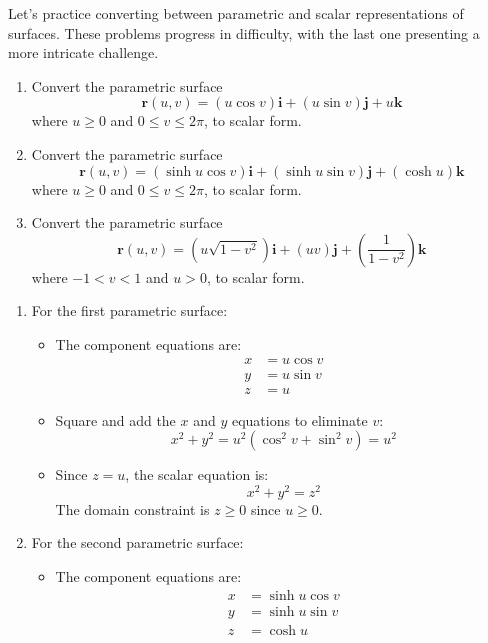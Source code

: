 \exampleline
\begin{example}
Let’s practice converting between parametric and scalar representations of surfaces. These problems progress in difficulty, with the last one presenting a more intricate challenge.

\begin{enumerate}
\item Convert the parametric surface
\[
\mathbf{r}(u,v) = (u\cos v)\mathbf{i} + (u\sin v)\mathbf{j} + u\mathbf{k}
\]
where $u \geq 0$ and $0 \leq v \leq 2\pi$, to scalar form.

\item Convert the parametric surface
\[
\mathbf{r}(u,v) = (\sinh u \cos v)\mathbf{i} + (\sinh u \sin v)\mathbf{j} + (\cosh u)\mathbf{k}
\]
where $u \geq 0$ and $0 \leq v \leq 2\pi$, to scalar form.

\item Convert the parametric surface
\[
\mathbf{r}(u,v) = \left(u\sqrt{1-v^2}\right)\mathbf{i} + \left(uv\right)\mathbf{j} + \left(\frac{1}{1-v^2}\right)\mathbf{k}
\]
where $-1 < v < 1$ and $u > 0$, to scalar form.
\end{enumerate}

\begin{solution}
\begin{enumerate}
\item For the first parametric surface:
   \begin{itemize}
       \item The component equations are:
       \begin{align*}
           x &= u \cos v \\
           y &= u \sin v \\
           z &= u
       \end{align*}

       \item Square and add the $x$ and $y$ equations to eliminate $v$:
       \[
       x^2 + y^2 = u^2 (\cos^2 v + \sin^2 v) = u^2
       \]

       \item Since $z = u$, the scalar equation is:
       \[
       x^2 + y^2 = z^2
       \]
       The domain constraint is $z \geq 0$ since $u \geq 0$.
   \end{itemize}

\item For the second parametric surface:
   \begin{itemize}
       \item The component equations are:
       \begin{align*}
           x &= \sinh u \cos v \\
           y &= \sinh u \sin v \\
           z &= \cosh u
       \end{align*}


\end{itemize}
\end{enumerate}
\end{solution}
\end{example}
